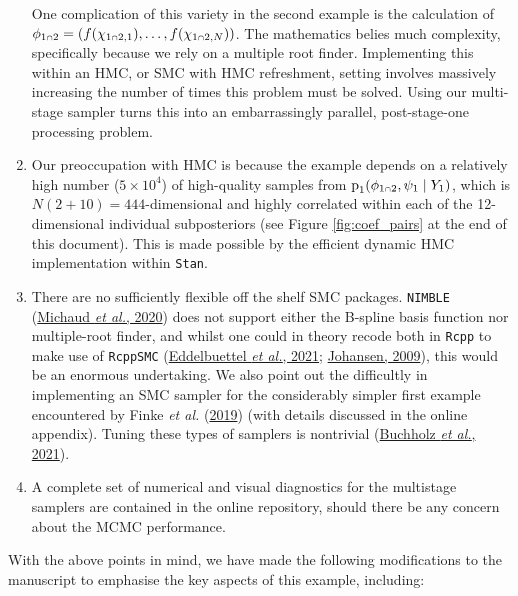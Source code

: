 \documentclass[
  10pt,
  a4paper,
]{article}
\let\Oldcap\cap
\renewcommand{\cap}{\mathrel{\mathsmaller{\Oldcap}}}
\newcommand{\pd}{\text{p}}
\begin{document}
\begin{enumerate}
  One complication of this variety in the second example is the
  calculation of
  \(\phi_{1 \cap 2} = (f(\chi_{1 \cap 2, 1}), \ldots, f(\chi_{1 \cap 2, N}))\).
  The mathematics belies much complexity, specifically because we rely
  on a multiple root finder. Implementing this within an HMC, or SMC
  with HMC refreshment, setting involves massively increasing the number
  of times this problem must be solved. Using our multi-stage sampler
  turns this into an embarrassingly parallel, post-stage-one processing
  problem.
\item
  Our preoccupation with HMC is because the example depends on a
  relatively high number (\(5 \times 10^{4}\)) of high-quality samples
  from \(\pd_{1}(\phi_{1 \cap 2}, \psi_{1} \mid Y_{1})\), which is
  \(N(2 + 10) = 444\)-dimensional and highly correlated within each of
  the 12-dimensional individual subposteriors (see Figure
  \ref{fig:coef_pairs} at the end of this document). This is made
  possible by the efficient dynamic HMC implementation within
  \texttt{Stan}.
\item
  There are no sufficiently flexible off the shelf SMC packages.
  \texttt{NIMBLE}
  (\protect\hyperlink{ref-michaud_sequential_2020}{Michaud \emph{et
  al.}, 2020}) does not support either the B-spline basis function nor
  multiple-root finder, and whilst one could in theory recode both in
  \texttt{Rcpp} to make use of \texttt{RcppSMC}
  (\protect\hyperlink{ref-eddelbuettel_rcppsmc_2021}{Eddelbuettel
  \emph{et al.}, 2021};
  \protect\hyperlink{ref-johansen_smctc_2009}{Johansen, 2009}), this
  would be an enormous undertaking. We also point out the difficultly in
  implementing an SMC sampler for the considerably simpler first example
  encountered by Finke \emph{et al.}
  (\protect\hyperlink{ref-finke_efficient_2019}{2019}) (with details
  discussed in the online appendix). Tuning these types of samplers is
  nontrivial (\protect\hyperlink{ref-buchholz_adaptive_2021}{Buchholz
  \emph{et al.}, 2021}).
\item
  A complete set of numerical and visual diagnostics for the multistage
  samplers are contained in the online repository, should there be any
  concern about the MCMC performance.
\end{enumerate}

With the above points in mind, we have made the following modifications
to the manuscript to emphasise the key aspects of this example,
including:
\end{document}

